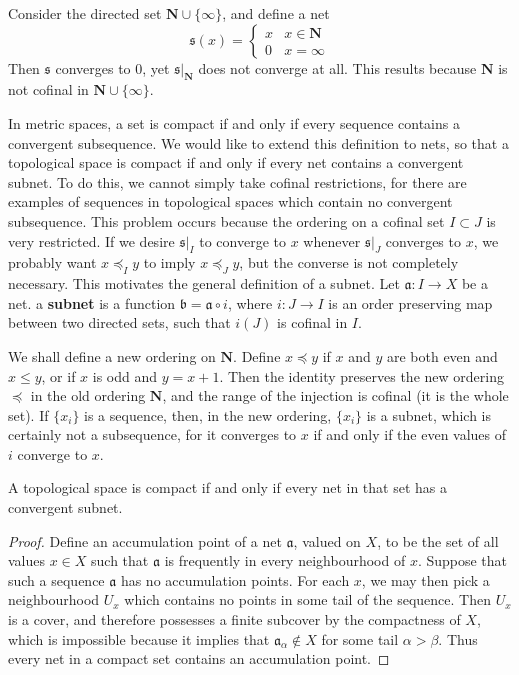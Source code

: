\begin{example}
\begin{example}
    Consider the directed set $\mathbf{N} \cup \{ \infty \}$, and define a net
    \[ \mathfrak{s}(x) = \begin{cases} x & x \in \mathbf{N} \\ 0 & x = \infty \end{cases} \]
    Then $\mathfrak{s}$ converges to $0$, yet $\mathfrak{s}|_\mathbf{N}$ does not converge at all. This results because $\mathbf{N}$ is not cofinal in $\mathbf{N} \cup \{ \infty \}$.
\end{example}

In metric spaces, a set is compact if and only if every sequence contains a convergent subsequence. We would like to extend this definition to nets, so that a topological space is compact if and only if every net contains a convergent subnet. To do this, we cannot simply take cofinal restrictions, for there are examples of sequences in topological spaces which contain no convergent subsequence. This problem occurs because the ordering on a cofinal set $I \subset J$ is very restricted. If we desire $\mathfrak{s}|_I$ to converge to $x$ whenever $\mathfrak{s}|_J$ converges to $x$, we probably want $x \preceq_I y$ to imply $x \preceq_J y$, but the converse is not completely necessary. This motivates the general definition of a subnet. Let $\mathfrak{a}: I \to X$ be a net. a {\bf subnet} is a function $\mathfrak{b} = \mathfrak{a} \circ i$, where $i: J \to I$ is an order preserving map between two directed sets, such that $i(J)$ is cofinal in $I$.

\begin{example}
    We shall define a new ordering on $\mathbf{N}$. Define $x \preceq y$ if $x$ and $y$ are both even and $x \leq y$, or if $x$ is odd and $y = x + 1$. Then the identity preserves the new ordering $\preceq$ in the old ordering $\mathbf{N}$, and the range of the injection is cofinal (it is the whole set). If $\{ x_i \}$ is a sequence, then, in the new ordering, $\{ x_i \}$ is a subnet, which is certainly not a subsequence, for it converges to $x$ if and only if the even values of $i$ converge to $x$.
\end{example}

\begin{theorem}
    A topological space is compact if and only if every net in that set has a convergent subnet.
\end{theorem}
\begin{proof}
    Define an accumulation point of a net $\mathfrak{a}$, valued on $X$, to be the set of all values $x \in X$ such that $\mathfrak{a}$ is frequently in every neighbourhood of $x$. Suppose that such a sequence $\mathfrak{a}$ has no accumulation points. For each $x$, we may then pick a neighbourhood $U_x$ which contains no points in some tail of the sequence. Then $U_x$ is a cover, and therefore possesses a finite subcover by the compactness of $X$, which is impossible because it implies that $\mathfrak{a}_\alpha \not \in X$ for some tail $\alpha > \beta$. Thus every net in a compact set contains an accumulation point.


\end{proof}
\end{example}
